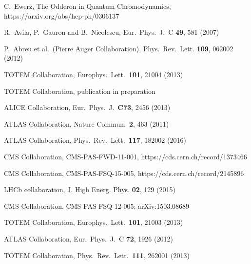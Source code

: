 \documentclass{webofc}
\begin{document}
\begin{thebibliography}{99}
	C.~Ewerz, The Odderon in Quantum Chromodynamics, https://arxiv.org/abs/hep-ph/0306137

	R.~Avila, P.~Gauron and B.~Nicolescu, Eur.~Phys.~J.~C \textbf{49}, 581 (2007)

	P.~Abreu et al.~(Pierre Auger Collaboration), Phys.~Rev.~Lett. \textbf{109}, 062002 (2012)

	TOTEM Collaboration, Europhys.~Lett.~\textbf{101}, 21004 (2013)

	TOTEM Collaboration, publication in preparation

	ALICE Collaboration, Eur.~Phys.~J.~\textbf{C73}, 2456 (2013)

	ATLAS Collaboration, Nature Commun.~\textbf{2}, 463 (2011)

	ATLAS Collaboration, Phys.~Rev.~Lett.~\textbf{117}, 182002 (2016)

	CMS Collaboration, CMS-PAS-FWD-11-001, https://cds.cern.ch/record/1373466

	CMS Collaboration, CMS-PAS-FSQ-15-005, https://cds.cern.ch/record/2145896

	LHCb collaboration, J. High Energ. Phys. \textbf{02}, 129 (2015)

	CMS Collaboration, CMS-PAS-FSQ-12-005; arXiv:1503.08689

	TOTEM Collaboration, Europhys.~Lett.~\textbf{101}, 21003 (2013)

	ATLAS Collaboration, Eur.~Phys.~J.~C \textbf{72}, 1926 (2012)

	TOTEM Collaboration, Phys.~Rev.~Lett.~\textbf{111}, 262001 (2013)



\end{thebibliography}
\end{document}

